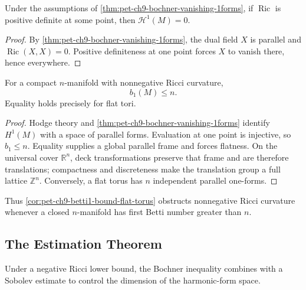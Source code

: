 \begin{corollary}
  \label{cor:pet-ch9-harmonic-1forms-vanish-positive-ricci}
  Under the assumptions of \cref{thm:pet-ch9-bochner-vanishing-1forms}, if
  $\operatorname{Ric}$ is positive definite at some point, then
  $\mathcal H^1(M)=0$.
\end{corollary}
\begin{proof}
  \sketch
  By \cref{thm:pet-ch9-bochner-vanishing-1forms}, the dual field \(X\) is
  parallel and \(\operatorname{Ric}(X,X)=0\).  Positive definiteness at one
  point forces \(X\) to vanish there, hence everywhere.
\end{proof}

\begin{corollary}
  \label{cor:pet-ch9-betti1-bound-flat-torus}
  For a compact $n$-manifold with nonnegative Ricci curvature,
  \[
    b_1(M)\le n.
  \]
  Equality holds precisely for flat tori.
\end{corollary}
\begin{proof}
  \sketch
  Hodge theory and \cref{thm:pet-ch9-bochner-vanishing-1forms} identify
  \(H^1(M)\) with a space of parallel forms.  Evaluation at one point is
  injective, so \(b_1\le n\).  Equality supplies a global parallel frame and
  forces flatness.  On the universal cover \(\mathbb R^n\), deck
  transformations preserve that frame and are therefore translations;
  compactness and discreteness make the translation group a full lattice
  \(\mathbb Z^n\).  Conversely, a flat torus has \(n\) independent parallel
  one-forms.
\end{proof}

Thus \cref{cor:pet-ch9-betti1-bound-flat-torus} obstructs nonnegative Ricci
curvature whenever a closed $n$-manifold has first Betti number greater than
$n$.

\subsection{The Estimation Theorem}

Under a negative Ricci lower bound, the Bochner inequality combines with a
Sobolev estimate to control the dimension of the harmonic-form space.

